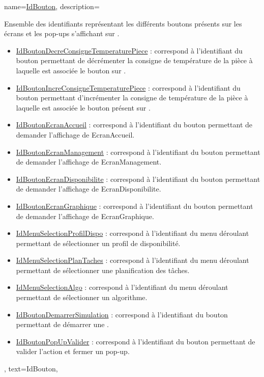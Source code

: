 {
    name={\underline{IdBouton}},
    description=
    {
        Ensemble des identifiants représentant les différents boutons présents sur les écrans et les pop-ups s'affichant sur \appAndroid.
        \begin{itemize}
            \item \underline{IdBoutonDecreConsigneTemperaturePiece} : correspond à l'identifiant du bouton permettant de décrémenter la consigne de température de la pièce à laquelle est associée le bouton sur \appAndroid.
            \item \underline{IdBoutonIncreConsigneTemperaturePiece} : correspond à l'identifiant du bouton permettant d'incrémenter la consigne de température de la pièce à laquelle est associée le bouton présent sur \appAndroid.
            \item \underline{IdBoutonEcranAccueil} :  correspond à l'identifiant du bouton permettant de demander l'affichage de EcranAccueil.
            \item \underline{IdBoutonEcranManagement} :  correspond à l'identifiant du bouton permettant de demander l'affichage de EcranManagement.
            \item \underline{IdBoutonEcranDisponibilite} : correspond à l'identifiant du bouton permettant de demander l'affichage de EcranDisponibilite.
            \item \underline{IdBoutonEcranGraphique} :  correspond à l'identifiant du bouton permettant de demander l'affichage de EcranGraphique.
            \item \underline{IdMenuSelectionProfilDispo} :  correspond à l'identifiant du menu déroulant permettant de sélectionner un profil de disponibilité.
            \item \underline{IdMenuSelectionPlanTaches} :  correspond à l'identifiant du menu déroulant permettant de sélectionner une planification des tâches.
            \item \underline{IdMenuSelectionAlgo} :  correspond à l'identifiant du menu déroulant permettant de sélectionner un algorithme.
            \item \underline{IdBoutonDemarrerSimulation} :  correspond à l'identifiant du bouton permettant de démarrer une \complete.
            \item \underline{IdBoutonPopUpValider} : correspond à l'identifiant du bouton permettant de valider l'action et fermer un pop-up.
        \end{itemize}
    },
    text={IdBouton},    
}
